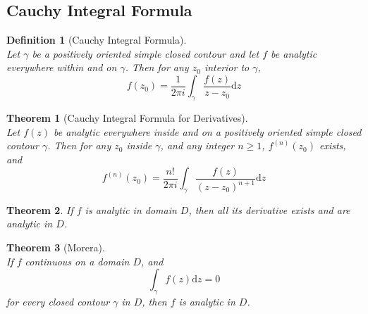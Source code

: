 \documentclass[12pt]{article}
\newcommand{\diff}{\mathrm{d}}
\newtheorem{definition}{Definition}[section]
\newtheorem{theorem}{Theorem}[section]
\theoremstyle{definition}
\begin{document}
\subsection{Cauchy Integral Formula}
\begin{definition}[Cauchy Integral Formula]
\hfill\\\normalfont Let $\gamma$ be a positively oriented simple closed contour and let $f$ be analytic everywhere within and on $\gamma$. Then for any $z_0$ interior to $\gamma$,
\[
f(z_0)=\frac{1}{2\pi i}\int_{\gamma}\frac{f(z)}{z-z_0}\diff z
\]
\end{definition}
\begin{theorem}[Cauchy Integral Formula for Derivatives]
\hfill\\\normalfont Let $f(z)$ be analytic everywhere inside and on a positively oriented simple closed contour $\gamma$. Then for any $z_0$ inside $\gamma$, and any integer $n\geq 1$, $f^{(n)}(z_0)$ exists, and
\[
f^{(n)}(z_0)=\frac{n!}{2\pi i}\int_{\gamma}\frac{f(z)}{(z-z_0)^{n+1}}\diff z
\]
\end{theorem}
\begin{theorem}\normalfont If $f$ is analytic in domain $D$, then all its derivative exists and are analytic in $D$.
\end{theorem}
\begin{theorem}[Morera]
\hfill\\\normalfont If $f$ continuous on a domain $D$, and
\[
\int_{\gamma}f(z)\diff z = 0
\]
for every closed contour $\gamma$ in $D$, then $f$ is analytic in $D$.
\end{theorem}
\end{document}
